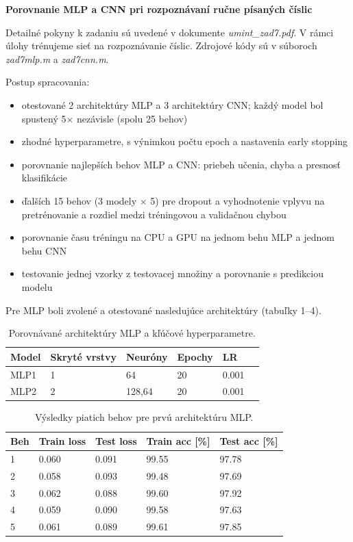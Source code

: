 \documentclass[12pt, a4paper]{article}
\begin{document}
\centerline{\textbf{\Large Porovnanie MLP a CNN pri rozpoznávaní ručne písaných číslic}}

Detailné pokyny k zadaniu sú uvedené v dokumente \textit{umint\_zad7.pdf}. V rámci úlohy trénujeme sieť na rozpoznávanie číslic. Zdrojové kódy sú v súboroch \textit{zad7mlp.m} a \textit{zad7cnn.m}.

Postup spracovania:
\begin{itemize}
    \item otestované 2 architektúry MLP a 3 architektúry CNN; každý model bol spustený 5$\times$ nezávisle (spolu 25 behov)
    \item zhodné hyperparametre, s výnimkou počtu epoch a nastavenia early stopping
    \item porovnanie najlepších behov MLP a CNN: priebeh učenia, chyba a presnosť klasifikácie
    \item ďalších 15 behov (3 modely $\times$ 5) pre dropout a vyhodnotenie vplyvu na pretrénovanie a rozdiel medzi tréningovou a validačnou chybou
    \item porovnanie času tréningu na CPU a GPU na jednom behu MLP a jednom behu CNN
    \item testovanie jednej vzorky z testovacej množiny a porovnanie s predikciou modelu
\end{itemize}


Pre MLP boli zvolené a otestované nasledujúce architektúry (tabuľky 1–4).


\begin{table}[htbp]
\centering
\caption{Porovnávané architektúry MLP a kľúčové hyperparametre.}
\label{tab:mlp_structures}
\begin{tabular}{llllll}
\toprule
Model & Skryté vrstvy & Neuróny & Epochy & LR \\
\midrule
MLP1 & 1 & 64 & 20 & 0.001 \\
MLP2 & 2 & 128,64 & 20 & 0.001 \\
\bottomrule
\end{tabular}
\end{table}

\begin{table}[htbp]
\centering
\caption{Výsledky piatich behov pre prvú architektúru MLP.}
\label{tab:mlp1_runs}
\begin{tabular}{lllll}
\toprule
Beh & Train loss & Test loss & Train acc [\%] & Test acc [\%] \\
\midrule
1 & 0.060 & 0.091 & 99.55 & 97.78 \\
2 & 0.058 & 0.093 & 99.48 & 97.69 \\
3 & 0.062 & 0.088 & 99.60 & 97.92 \\
4 & 0.059 & 0.090 & 99.58 & 97.63 \\
5 & 0.061 & 0.089 & 99.61 & 97.85 \\
\bottomrule
\end{tabular}
\end{table}
\end{document}
